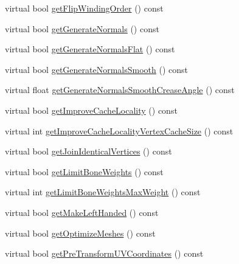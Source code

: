 \begin{DoxyCompactItemize}
virtual bool \hyperlink{classrepo_1_1manipulator_1_1modelconvertor_1_1_model_import_config_ae2e3b6f3ebfee43e4cc240ef67b6351d}{get\+Flip\+Winding\+Order} () const 
\item 
virtual bool \hyperlink{classrepo_1_1manipulator_1_1modelconvertor_1_1_model_import_config_ad2b6ae83b8a7b8436434869c7fb0d67f}{get\+Generate\+Normals} () const 
\item 
virtual bool \hyperlink{classrepo_1_1manipulator_1_1modelconvertor_1_1_model_import_config_a1e850f706c8ac8b5d9ccacf826756608}{get\+Generate\+Normals\+Flat} () const 
\item 
virtual bool \hyperlink{classrepo_1_1manipulator_1_1modelconvertor_1_1_model_import_config_a53077150e077cc0e4c5bdab11ae57aed}{get\+Generate\+Normals\+Smooth} () const 
\item 
virtual float \hyperlink{classrepo_1_1manipulator_1_1modelconvertor_1_1_model_import_config_aa1e98eaa61a0dc57b262f817bdbc955d}{get\+Generate\+Normals\+Smooth\+Crease\+Angle} () const 
\item 
virtual bool \hyperlink{classrepo_1_1manipulator_1_1modelconvertor_1_1_model_import_config_a01a23d98f545d49052cb4c7432a023fa}{get\+Improve\+Cache\+Locality} () const 
\item 
virtual int \hyperlink{classrepo_1_1manipulator_1_1modelconvertor_1_1_model_import_config_a82d3be19e4c19c95d3562d38d1f245e2}{get\+Improve\+Cache\+Locality\+Vertex\+Cache\+Size} () const 
\item 
virtual bool \hyperlink{classrepo_1_1manipulator_1_1modelconvertor_1_1_model_import_config_aeea89891250d475d64a17765ca8cfda7}{get\+Join\+Identical\+Vertices} () const 
\item 
virtual bool \hyperlink{classrepo_1_1manipulator_1_1modelconvertor_1_1_model_import_config_a15513acb116999ad96b1df1a219f69b9}{get\+Limit\+Bone\+Weights} () const 
\item 
virtual int \hyperlink{classrepo_1_1manipulator_1_1modelconvertor_1_1_model_import_config_a8da86e9887abb758c1b47f5a73490bdf}{get\+Limit\+Bone\+Weights\+Max\+Weight} () const 
\item 
virtual bool \hyperlink{classrepo_1_1manipulator_1_1modelconvertor_1_1_model_import_config_a1fe954cff7d3cc354799516ea19c7ff9}{get\+Make\+Left\+Handed} () const 
\item 
virtual bool \hyperlink{classrepo_1_1manipulator_1_1modelconvertor_1_1_model_import_config_a1e5aed8fd20fe2301ec095865c1c7741}{get\+Optimize\+Meshes} () const 
\item 
virtual bool \hyperlink{classrepo_1_1manipulator_1_1modelconvertor_1_1_model_import_config_a36e8e23ee5a4df2930bf87a0ecb3285d}{get\+Pre\+Transform\+U\+V\+Coordinates} () const 

\end{DoxyCompactItemize}
